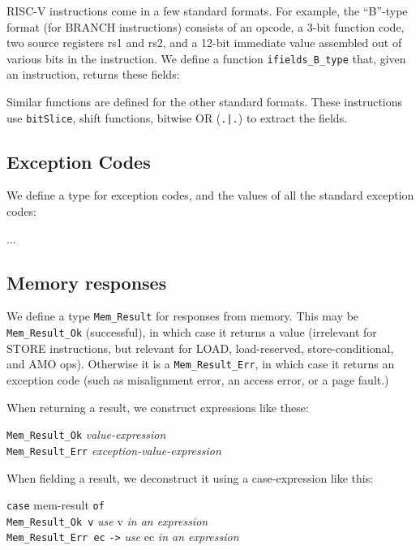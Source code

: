 \documentclass[11pt]{article}
\newcommand{\hm}{\hspace*{1em}}
\newcommand{\hmmm}{\hspace*{3em}}
\begin{document}
RISC-V instructions come in a few standard formats.  For example, the
``B''-type format (for BRANCH instructions) consists of an opcode, a
3-bit function code, two source registers rs1 and rs2, and a 12-bit
immediate value assembled out of various bits in the instruction.  We
define a function \verb|ifields_B_type| that, given an instruction,
returns these fields:



Similar functions are defined for the other standard formats.  These
instructions use \verb|bitSlice|, shift functions, bitwise OR
(\verb/.|./) to extract the fields.


\subsection{Exception Codes}

We define a type for exception codes, and the values of all the standard exception codes:



...




\subsection{Memory responses}

We define a type {\tt Mem\_Result} for responses from memory.  This
may be {\tt Mem\_Result\_Ok} (successful), in which case it returns a
value (irrelevant for STORE instructions, but relevant for LOAD,
load-reserved, store-conditional, and AMO ops).  Otherwise it is a
{\tt Mem\_Result\_Err}, in which case it returns an exception code
(such as misalignment error, an access error, or a page fault.)



When returning a result, we construct expressions like these:
\begin{tabbing}
\hmmm \= {\tt Mem\_Result\_Ok} \hm \= \emph{value-expression} \\
      \> {\tt Mem\_Result\_Err}    \> \emph{exception-value-expression}
\end{tabbing}

When fielding a result, we deconstruct it using a case-expression like this:
\begin{tabbing}
\hmmm \= {\tt case} mem-result {\tt of} \\
      \> \hm \= {\tt Mem\_Result\_Ok v} \hm {\tt ->} \= \emph{use} v \emph{in an expression} \\
      \>     \> {\tt Mem\_Result\_Err ec}   {\tt ->} \> \emph{use} ec \emph{in an expression}
\end{tabbing}
\end{document}
